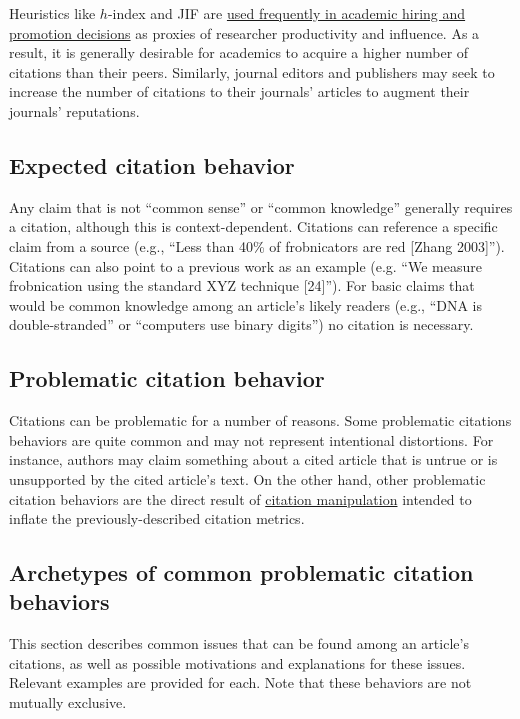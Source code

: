 \documentclass[letterpaper, 12pt]{article}
\begin{document}
Heuristics like $h$-index and JIF are \href{https://doi.org/10.1038/d41586-022-02984-2}{used frequently in academic hiring and promotion decisions} as proxies of researcher productivity and influence. As a result, it is generally desirable for academics to acquire a higher number of citations than their peers. Similarly, journal editors and publishers may seek to increase the number of citations to their journals' articles to augment their journals' reputations.

\subsection*{Expected citation behavior}

Any claim that is not ``common sense'' or ``common knowledge'' generally requires a citation, although this is context-dependent.
Citations can reference a specific claim from a source (e.g., ``Less than 40\% of frobnicators are red [Zhang 2003]''). 
Citations can also point to a previous work as an example (e.g. ``We measure frobnication using the standard XYZ technique [24]'').
For basic claims that would be common knowledge among an article's likely readers (e.g., ``DNA is double-stranded'' or ``computers use binary digits'')
no citation is necessary.

\subsection*{Problematic citation behavior}

Citations can be problematic for a number of reasons. Some problematic citations behaviors are quite common and may not represent intentional distortions. For instance, authors may claim something about a cited article that is untrue or is unsupported by the cited article's text. On the other hand, other problematic citation behaviors are the direct result of \href{https://doi.org/10.24318/cope.2019.3.1}{citation manipulation} intended to inflate the previously-described citation metrics.

\subsection*{Archetypes of common problematic citation behaviors}

This section describes common issues that can be found among an article's citations, as well as possible motivations and explanations for these issues. Relevant examples are provided for each. Note that these behaviors are not mutually exclusive.
\end{document}
